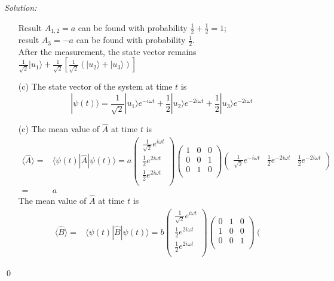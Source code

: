 \documentclass[12pt,a4paper]{article}
\newenvironment{sol}
    {\emph{Solution:}
    }
    {
    \qed
    }
\begin{document}
\begin{sol}
\begin{itemize}
Result $A_{1,2}=a$ can be found with probability $\frac{1}{2}+\frac{1}{2}=1$;\\
result $A_3=-a$ can be found with probability $\frac{1}{2}$.\\
After the measurement, the state vector remains $\frac{1}{\sqrt{2}}|u_1\rangle+\frac{1}{\sqrt{2}}\left[\frac{1}{\sqrt{2}}(|u_2\rangle+|u_3\rangle)\right]$
\item[(c)] The state vector of the system at time $t$ is
\begin{equation}
|\psi(t)\rangle=\frac{1}{\sqrt{2}}|u_1\rangle e^{-i\omega t}+\frac{1}{2}|u_2\rangle e^{-2i\omega t}+\frac{1}{2}|u_3\rangle e^{-2i\omega t}
\end{equation}
\item[(c)] The mean value of $\hat{A}$ at time $t$ is
\begin{align}
\nonumber\langle\hat{A}\rangle=&\langle\psi(t)|\hat{A}|\psi(t)\rangle=a\left(\begin{array}{c}
\frac{1}{\sqrt{2}}e^{i\omega t}\\
\frac{1}{2}e^{2i\omega t}\\
\frac{1}{2}e^{2i\omega t}\\
\end{array}\right)\left(\begin{array}{ccc}
1&0&0\\
0&0&1\\
0&1&0\\
\end{array}\right)\left(\begin{array}{ccc}
\frac{1}{\sqrt{2}}e^{-i\omega t}&\frac{1}{2}e^{-2i\omega t}&\frac{1}{2}e^{-2i\omega t}
\end{array}\right)\\
=&a
\end{align}
The mean value of $\hat{A}$ at time $t$ is
\begin{align}
\nonumber\langle\hat{B}\rangle=&\langle\psi(t)|\hat{B}|\psi(t)\rangle=b\left(\begin{array}{c}
\frac{1}{\sqrt{2}}e^{i\omega t}\\
\frac{1}{2}e^{2i\omega t}\\
\frac{1}{2}e^{2i\omega t}\\
\end{array}\right)\left(\begin{array}{ccc}
0&1&0\\
1&0&0\\
0&0&1\\
\end{array}\right)\left(\begin{array}{ccc}

\end{array}
\end{align}
\end{itemize}
\end{sol}
\end{document}
